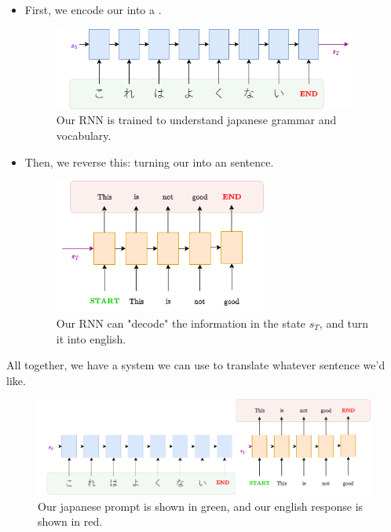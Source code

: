         \begin{itemize}
            \item First, we encode our  into a .

            \begin{figure}[H]
                \centering
                \includegraphics[width=100mm]{images/transformers_images/rnn_translate_encode.png}
                \caption*{Our RNN is trained to understand japanese grammar and vocabulary.}
            \end{figure}

            \item Then, we reverse this: turning our  into an  sentence.

            \begin{figure}[H]
                \centering
                \includegraphics[width=70mm]{images/transformers_images/rnn_translate_decode.png}
                \caption*{Our RNN can "decode" the information in the state $s_T$, and turn it into english.}
            \end{figure}
        \end{itemize}

        All together, we have a system we can use to translate whatever sentence we'd like.

        \begin{figure}[H]
            \centering
            \includegraphics[width=\linewidth]{images/transformers_images/rnn_translate.png}
            \caption*{Our japanese prompt is shown in green, and our english response is shown in red.}
        \end{figure}

